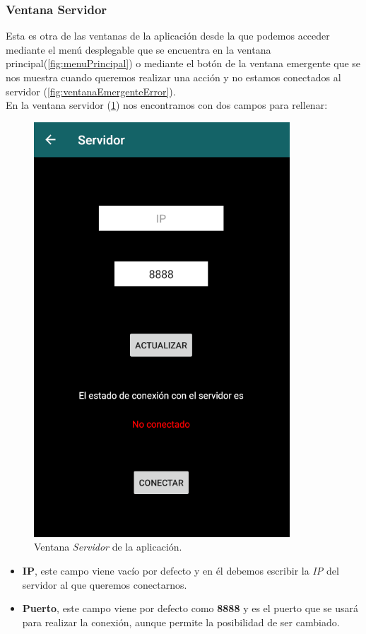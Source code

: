 \subsubsection{Ventana Servidor}

Esta es otra de las ventanas de la aplicación desde la que podemos acceder mediante el menú desplegable que se encuentra en la ventana principal(\ref{fig:menuPrincipal}) o mediante el botón de la ventana emergente que se nos muestra cuando queremos realizar una acción y no estamos conectados al servidor (\ref{fig:ventanaEmergenteError}).\\

En la ventana servidor (\ref{fig:servidor}) nos encontramos con dos campos para rellenar:

\begin{figure}[h!]
	\centering
	\includegraphics[width=0.6\linewidth]{img/servidor}
	\caption{Ventana \textit{Servidor} de la aplicación.}
	\label{fig:servidor}
\end{figure}

\begin{itemize}
	\item \textbf{IP}, este campo viene vacío por defecto y en él debemos escribir la \textit{IP} del servidor al que queremos conectarnos.
	\item \textbf{Puerto}, este campo viene por defecto como \textbf{8888} y es el puerto que se usará para realizar la conexión, aunque permite la posibilidad de ser cambiado.
\end{itemize}

